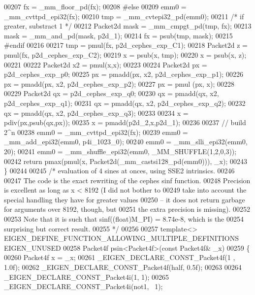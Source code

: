 \begin{DoxyCode}
00207   fx = \_mm\_floor\_pd(fx);
00208 \textcolor{preprocessor}{#else}
00209   emm0 = \_mm\_cvttpd\_epi32(fx);
00210   tmp  = \_mm\_cvtepi32\_pd(emm0);
00211   \textcolor{comment}{/* if greater, substract 1 */}
00212   Packet2d mask = \_mm\_cmpgt\_pd(tmp, fx);
00213   mask = \_mm\_and\_pd(mask, p2d\_1);
00214   fx = psub(tmp, mask);
00215 \textcolor{preprocessor}{#endif}
00216 
00217   tmp = pmul(fx, p2d\_cephes\_exp\_C1);
00218   Packet2d z = pmul(fx, p2d\_cephes\_exp\_C2);
00219   x = psub(x, tmp);
00220   x = psub(x, z);
00221 
00222   Packet2d x2 = pmul(x,x);
00223 
00224   Packet2d px = p2d\_cephes\_exp\_p0;
00225   px = pmadd(px, x2, p2d\_cephes\_exp\_p1);
00226   px = pmadd(px, x2, p2d\_cephes\_exp\_p2);
00227   px = pmul (px, x);
00228 
00229   Packet2d qx = p2d\_cephes\_exp\_q0;
00230   qx = pmadd(qx, x2, p2d\_cephes\_exp\_q1);
00231   qx = pmadd(qx, x2, p2d\_cephes\_exp\_q2);
00232   qx = pmadd(qx, x2, p2d\_cephes\_exp\_q3);
00233 
00234   x = pdiv(px,psub(qx,px));
00235   x = pmadd(p2d\_2,x,p2d\_1);
00236 
00237   \textcolor{comment}{// build 2^n}
00238   emm0 = \_mm\_cvttpd\_epi32(fx);
00239   emm0 = \_mm\_add\_epi32(emm0, p4i\_1023\_0);
00240   emm0 = \_mm\_slli\_epi32(emm0, 20);
00241   emm0 = \_mm\_shuffle\_epi32(emm0, \_MM\_SHUFFLE(1,2,0,3));
00242   \textcolor{keywordflow}{return} pmax(pmul(x, Packet2d(\_mm\_castsi128\_pd(emm0))), \_x);
00243 \}
00244 
00245 \textcolor{comment}{/* evaluation of 4 sines at onces, using SSE2 intrinsics.}
00246 \textcolor{comment}{}
00247 \textcolor{comment}{   The code is the exact rewriting of the cephes sinf function.}
00248 \textcolor{comment}{   Precision is excellent as long as x < 8192 (I did not bother to}
00249 \textcolor{comment}{   take into account the special handling they have for greater values}
00250 \textcolor{comment}{   -- it does not return garbage for arguments over 8192, though, but}
00251 \textcolor{comment}{   the extra precision is missing).}
00252 \textcolor{comment}{}
00253 \textcolor{comment}{   Note that it is such that sinf((float)M\_PI) = 8.74e-8, which is the}
00254 \textcolor{comment}{   surprising but correct result.}
00255 \textcolor{comment}{*/}
00256 
00257 \textcolor{keyword}{template}<> EIGEN\_DEFINE\_FUNCTION\_ALLOWING\_MULTIPLE\_DEFINITIONS EIGEN\_UNUSED
00258 Packet4f psin<Packet4f>(\textcolor{keyword}{const} Packet4f& \_x)
00259 \{
00260   Packet4f x = \_x;
00261   \_EIGEN\_DECLARE\_CONST\_Packet4f(1 , 1.0f);
00262   \_EIGEN\_DECLARE\_CONST\_Packet4f(half, 0.5f);
00263 
00264   \_EIGEN\_DECLARE\_CONST\_Packet4i(1, 1);
00265   \_EIGEN\_DECLARE\_CONST\_Packet4i(not1, ~1);

\end{DoxyCode}
